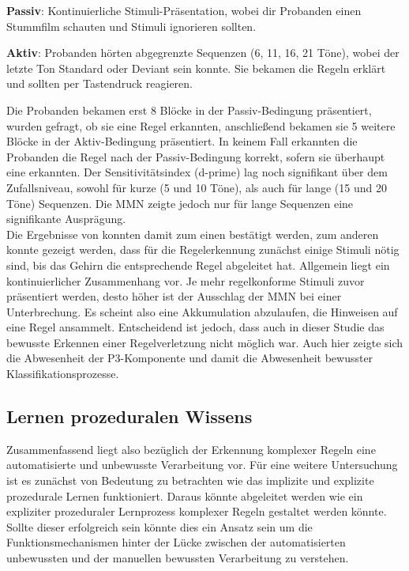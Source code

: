 \documentclass[doc,a4paper,12pt]{apa6}
\begin{document}
\begin{compactitem}
  \item \textbf{Passiv}: Kontinuierliche Stimuli-Präsentation, wobei dir Probanden einen Stummfilm schauten und Stimuli ignorieren sollten.
  \item \textbf{Aktiv}: Probanden hörten abgegrenzte Sequenzen (6, 11, 16, 21 Töne), wobei der letzte Ton Standard oder Deviant sein konnte. Sie bekamen die Regeln erklärt und sollten per Tastendruck reagieren.
\end{compactitem}

Die Probanden bekamen erst 8 Blöcke in der Passiv-Bedingung präsentiert, wurden gefragt, ob sie eine Regel erkannten, anschließend bekamen sie 5 weitere Blöcke in der Aktiv-Bedingung präsentiert. In keinem Fall erkannten die Probanden die Regel nach der Passiv-Bedingung korrekt, sofern sie überhaupt eine erkannten. Der Sensitivitätsindex (d-prime) lag noch signifikant über dem Zufallsniveau, sowohl für kurze (5 und 10 Töne), als auch für lange (15 und 20 Töne) Sequenzen. Die MMN zeigte jedoch nur für lange Sequenzen eine signifikante Ausprägung.\\
Die Ergebnisse von \textcite{paavilainen2007preattentive} konnten damit zum einen bestätigt werden, zum anderen konnte gezeigt werden, dass für die Regelerkennung zunächst einige Stimuli nötig sind, bis das Gehirn die entsprechende Regel abgeleitet hat. Allgemein liegt ein kontinuierlicher Zusammenhang vor. Je mehr regelkonforme Stimuli zuvor präsentiert werden, desto höher ist der Ausschlag der MMN bei einer Unterbrechung. Es scheint also eine Akkumulation abzulaufen, die Hinweisen auf eine Regel ansammelt. Entscheidend ist jedoch, dass auch in dieser Studie das bewusste Erkennen einer Regelverletzung nicht möglich war. Auch hier zeigte sich die Abwesenheit der P3-Komponente und damit die Abwesenheit bewusster Klassifikationsprozesse.

\subsection{Lernen prozeduralen Wissens}

Zusammenfassend liegt also bezüglich der Erkennung komplexer Regeln eine automatisierte und unbewusste Verarbeitung vor. Für eine weitere Untersuchung ist es zunächst von Bedeutung zu betrachten wie das implizite und explizite prozedurale Lernen funktioniert. Daraus könnte abgeleitet werden wie ein expliziter prozeduraler Lernprozess komplexer Regeln gestaltet werden könnte. Sollte dieser erfolgreich sein könnte dies ein Ansatz sein um die Funktionsmechanismen hinter der Lücke zwischen der automatisierten unbewussten und der manuellen bewussten Verarbeitung zu verstehen.
\end{document}
